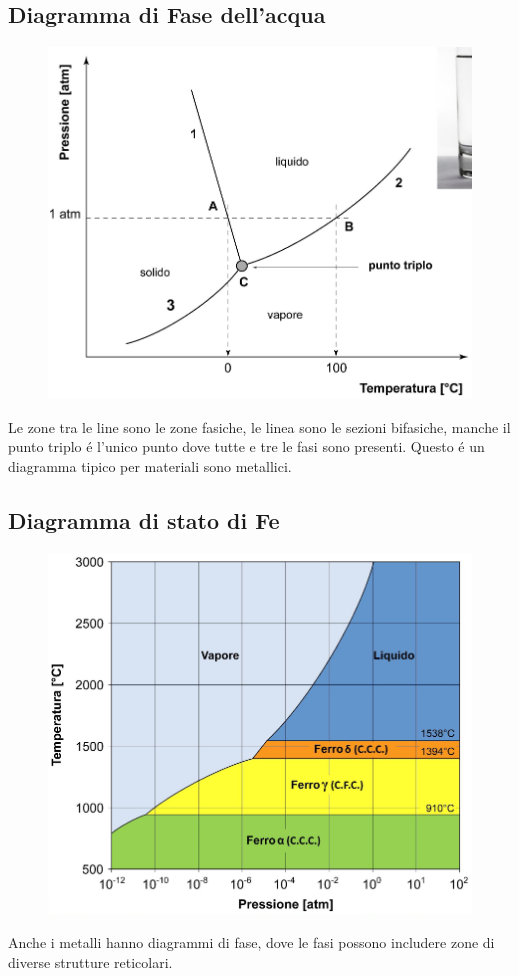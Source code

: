 \documentclass{article}
\begin{document}
{        \subsection{Diagramma di Fase dell'acqua}
            \begin{figure}[!h]
                \centering
                \includegraphics[width=.85\linewidth]{Diagramma di stato dell'acqua.png}
            \end{figure}
            Le zone tra le line sono le zone fasiche, le linea sono le sezioni bifasiche, manche il punto triplo \'e l'unico punto dove tutte e tre le fasi sono presenti. Questo \'e un diagramma tipico per materiali sono metallici.
        \subsection{Diagramma di stato di Fe}
            \begin{figure}[!h]
                \centering
                \includegraphics[width=.85\linewidth]{Diagramma di stato del Ferro puro.png}
            \end{figure}
            Anche i metalli hanno diagrammi di fase, dove le fasi possono includere zone di diverse strutture reticolari.
}
\end{document}

